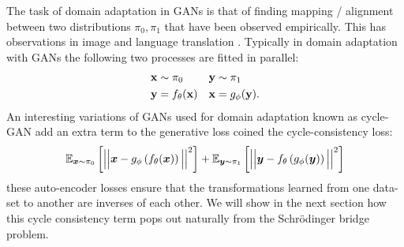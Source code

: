 \documentclass[a4paper,12pt,twoside,openright]{report}
\theoremstyle{definition}
\begin{document}
The task of domain adaptation in GANs is that of finding mapping / alignment between two distributions $\pi_0, \pi_1$ that have been observed empirically. This has observations in image and language translation \citep{zhu2017unpaired,lample2017unsupervised}. Typically in domain adaptation with GANs the following two processes are fitted in parallel:
\begin{align*}
    {\mathbf{x}} &\sim \pi_0    &{\mathbf{y}} &\sim \pi_1\\
    {\mathbf{y}} &= f_{\theta}({\mathbf{x}})   &{\mathbf{x}} &= g_{\phi}({\mathbf{y}}).
\end{align*}
An interesting variations of GANs used for domain adaptation known as cycle-GAN add an extra term to the generative loss coined the cycle-consistency loss:
\begin{align*}
   \mathbb{E}_{{\bm{x}} \sim \pi_0}\left[ \Big|\Big|{\bm{x}}- g_\phi\left(f_\theta({\bm{x}}) \right) \Big|\Big|^2\right] +  \mathbb{E}_{{\bm{y}} \sim \pi_1}\left[ \Big|\Big|{\bm{y}}- f_\theta\left(g_\phi({\bm{y}}) \right) \Big|\Big|^2\right]
\end{align*}
these auto-encoder losses ensure that the transformations learned from one data-set to another are inverses of each other. We will show in the next section how this cycle consistency term pops out naturally from the Schrödinger bridge problem.
\end{document}
